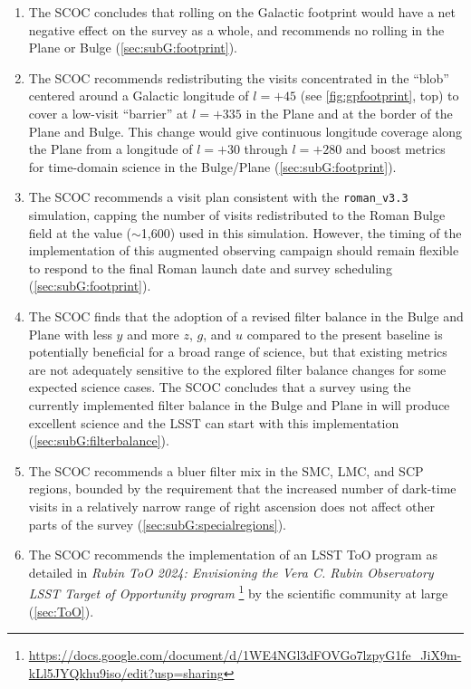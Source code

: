 \begin{enumerate}
\item The SCOC concludes that rolling on the Galactic footprint would have a net negative effect on the survey as a whole, and recommends no rolling in the Plane or Bulge (\autoref{sec:subG:footprint}).


\item The SCOC recommends redistributing the visits concentrated in the ``blob'' centered around a Galactic longitude of $l=+45$ (see \autoref{fig:gpfootprint}, top) to cover a low-visit ``barrier'' at $l=+335$ in the Plane and at the border of the Plane and Bulge. This change would give continuous longitude coverage along the Plane from a longitude of $l=+30$  through $l=+280$ and boost metrics for time-domain science in the Bulge/Plane (\autoref{sec:subG:footprint}).

\item The SCOC recommends a visit plan consistent with the \texttt{roman\_v3.3} simulation, capping the number of visits redistributed to the Roman Bulge field at the value (\mbox{$\sim$1,600}) used in this simulation. However, the timing of the implementation of this augmented observing campaign should remain flexible to respond to the final Roman launch date and survey scheduling (\autoref{sec:subG:footprint}).

\item The SCOC finds that the adoption of a revised filter balance in the Bulge and Plane with less $y$ and more $z$, $g$, and $u$ compared to the present baseline is potentially beneficial for a broad range of science, but that existing metrics are not adequately sensitive to the explored filter balance changes for some expected science cases. The SCOC concludes that a survey using the currently implemented filter balance in the Bulge and Plane in  will produce excellent science and the LSST can start with this implementation (\autoref{sec:subG:filterbalance}).

\item The SCOC recommends a bluer filter mix in the SMC, LMC, and SCP regions, bounded by the requirement that the increased number of dark-time visits in a relatively narrow range of right ascension does not affect other parts of the survey (\autoref{sec:subG:specialregions}).

\item The SCOC recommends the implementation of an LSST ToO program as detailed in \emph{Rubin ToO 2024: 
Envisioning the Vera C. Rubin Observatory LSST Target of Opportunity program
}\footnote{\url{https://docs.google.com/document/d/1WE4NGl3dFOVGo7lzpyG1fe_JiX9m-kLl5JYQkhu9iso/edit?usp=sharing}} by the scientific community at large (\autoref{sec:ToO}).


\end{enumerate}
